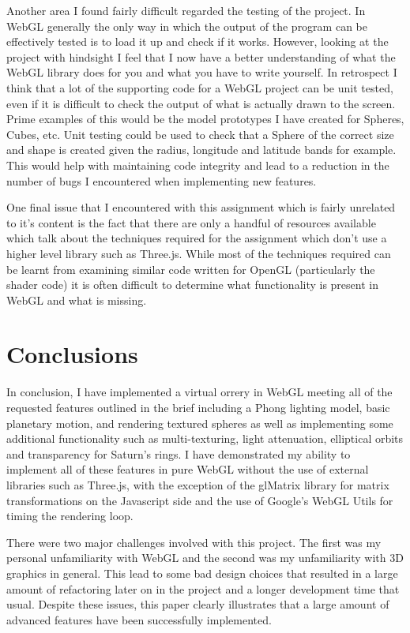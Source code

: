 \documentclass[conference]{IEEEtran}
\begin{document}
Another area I found fairly difficult regarded the testing of the project. In WebGL generally the only way in which the output of the program can be effectively tested is to load it up and check if it works. However, looking at the project with hindsight I feel that I now have a better understanding of what the WebGL library does for you and what you have to write yourself. In retrospect I think that a lot of the supporting code for a WebGL project can be unit tested, even if it is difficult to check the output of what is actually drawn to the screen. Prime examples of this would be the model prototypes I have created for Spheres, Cubes, etc. Unit testing could be used to check that a Sphere of the correct size and shape is created given the radius, longitude and latitude bands for example. This would help with maintaining code integrity and lead to a reduction in the number of bugs I encountered when implementing new features.

One final issue that I encountered with this assignment which is fairly unrelated to it's content is the fact that there are only a handful of resources available which talk about the techniques required for the assignment which don't use a higher level library such as Three.js. While most of the techniques required can be learnt from examining similar code written for OpenGL (particularly the shader code) it is often difficult to determine what functionality is present in WebGL and what is missing.

\section{Conclusions}
\label{sec:conclusions}
In conclusion, I have implemented a virtual orrery in WebGL meeting all of the requested features outlined in the brief including a Phong lighting model, basic planetary motion, and rendering textured spheres as well as implementing some additional functionality such as multi-texturing, light attenuation, elliptical orbits and transparency for Saturn's rings. I have demonstrated my ability to implement all of these features in pure WebGL without the use of external libraries such as Three.js, with the exception of the glMatrix library \cite{glmatrix} for matrix transformations on the Javascript side and the use of Google's WebGL Utils \cite{webgl-utils} for timing the rendering loop.

There were two major challenges involved with this project. The first was my personal unfamiliarity with WebGL and the second was my unfamiliarity with 3D graphics in general. This lead to some bad design choices that resulted in a large amount of refactoring later on in the project and a longer development time that usual. Despite these issues, this paper clearly illustrates that a large amount of advanced features have been successfully implemented.
\end{document}
